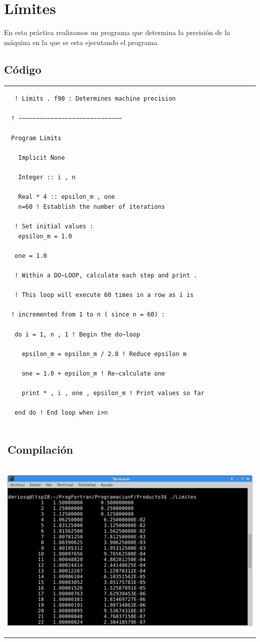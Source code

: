\documentclass[10pt]{article}
\begin{document}
\section{Límites}
En esta práctica realizamos un programa que determina la precisión de la máquina en la que se esta ejecutando el programa.

\subsection{Código}
\begin{tabular}{l}
\begin{verbatim}  
  ! Limits . f90 : Determines machine precision

 ! −−−−−−−−−−−−−−−−−−−−−−−−−−−−−

 Program Limits

   Implicit None

   Integer :: i , n

   Real * 4 :: epsilon_m , one
   n=60 ! Establish the number of iterations

  ! Set initial values :
   epsilon_m = 1.0

  one = 1.0

  ! Within a DO−LOOP, calculate each step and print .

  ! This loop will execute 60 times in a row as i is

 ! incremented from 1 to n ( since n = 60) :

  do i = 1, n , 1 ! Begin the do−loop

    epsilon_m = epsilon_m / 2.0 ! Reduce epsilon m

    one = 1.0 + epsilon_m ! Re−calculate one

    print * , i , one , epsilon_m ! Print values so far

  end do ! End loop when i>n
\end{verbatim} \\
\subsection{Compilación}\\

\begin{center}
   \includegraphics[scale=0.4]{L}
\end{center}
\end{tabular}
\end{document}
